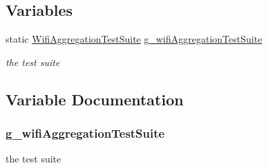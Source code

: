 \subsection*{Variables}
\begin{DoxyCompactItemize}
\item 
static \hyperlink{classWifiAggregationTestSuite}{Wifi\+Aggregation\+Test\+Suite} \hyperlink{wifi-aggregation-test_8cc_ad273a6a3af2458f55e3e38bc7cdcbf7e}{g\+\_\+wifi\+Aggregation\+Test\+Suite}
\begin{DoxyCompactList}\small\item\em the test suite \end{DoxyCompactList}\end{DoxyCompactItemize}


\subsection{Variable Documentation}
\subsubsection[{\texorpdfstring{g\+\_\+wifi\+Aggregation\+Test\+Suite}{g_wifiAggregationTestSuite}}]{ g\+\_\+wifi\+Aggregation\+Test\+Suite\hspace{0.3cm}{\ttfamily [static]}}\hypertarget{wifi-aggregation-test_8cc_ad273a6a3af2458f55e3e38bc7cdcbf7e}{}\label{wifi-aggregation-test_8cc_ad273a6a3af2458f55e3e38bc7cdcbf7e}


the test suite 

